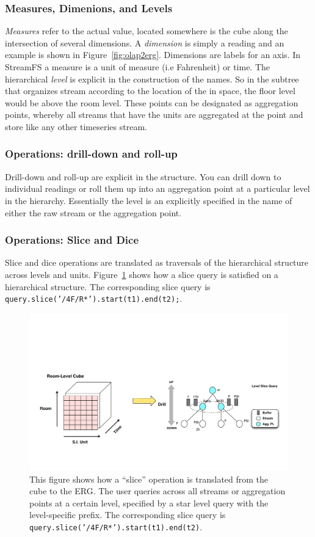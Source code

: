 \subsubsection{Measures, Dimenions, and Levels}
\emph{Measures} refer to the actual value, located somewhere is the cube along the intersection of several dimensions.
A \emph{dimension} is simply a reading and an example is shown in Figure~\ref{fig:olap2erg}.  Dimensions 
are labels for an axis.  In StreamFS a measure is a unit of measure (i.e Fahrenheit) or time.  The hierarchical \emph{level}
is explicit in the construction of the names.  So in the subtree that organizes stream according to the location of the
in space, the floor level would be above the room level.  These points can be designated as aggregation points, whereby
all streams that have the units are aggregated at the point and store like any other timeseries stream.

\subsubsection{Operations: drill-down and roll-up}
Drill-down and roll-up are explicit in the structure.  You can drill down to individual readings or roll them
up into an aggregation point at a particular level in the hierarchy.  Essentially the level is an explicitly specified in the 
name of either the raw stream or the aggregation point.

\subsubsection{Operations: Slice and Dice}
Slice and dice operations are translated as traversals of the hierarchical structure across levels and units.  Figure~\ref{fig:olapslice2ergslice}
shows how a slice query is satisfied on a hierarchical structure.  The corresponding slice query 
is \texttt{query.slice('/4F/R*').start(t1).end(t2);}.

\begin{figure}[h!] %
\centering
\includegraphics[width=1.0\columnwidth]{figs/olapslice2ergslice}
\caption{This figure shows how a ``slice'' operation is translated from the cube to the ERG.  The user queries across all streams or aggregation
points at a certain level, specified by a star level query with the level-specific prefix.  The corresponding slice query is
\texttt{query.slice('/4F/R*').start(t1).end(t2)}.
}
\label{fig:olapslice2ergslice}
\end{figure}


